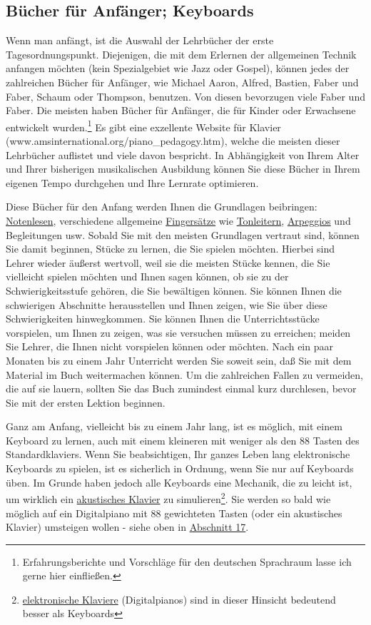 \subsection{Bücher für Anfänger; Keyboards}\hypertarget{c1iii18b}{}

Wenn man anfängt, ist die Auswahl der Lehrbücher der erste Tagesordnungspunkt.
Diejenigen, die mit dem Erlernen der allgemeinen Technik anfangen möchten (kein Spezialgebiet wie Jazz oder Gospel), können jedes der zahlreichen Bücher für Anfänger, wie Michael Aaron, Alfred, Bastien, Faber und Faber, Schaum oder Thompson, benutzen.
Von diesen bevorzugen viele Faber und Faber.
Die meisten haben Bücher für Anfänger, die für Kinder oder Erwachsene entwickelt wurden.\footnote{Erfahrungsberichte und Vorschläge für den deutschen Sprachraum lasse ich gerne hier einfließen.}
Es gibt eine exzellente Website für Klavier (www.amsinternational.org/piano_pedagogy.htm), welche die meisten dieser Lehrbücher auflistet und viele davon bespricht.
In Abhängigkeit von Ihrem Alter und Ihrer bisherigen musikalischen Ausbildung können Sie diese Bücher in Ihrem eigenen Tempo durchgehen und Ihre Lernrate optimieren.

Diese Bücher für den Anfang werden Ihnen die Grundlagen beibringen: \hyperlink{c1iii11}{Notenlesen}, verschiedene allgemeine \hyperlink{c1ii18}{Fingersätze} wie \hyperlink{c1iii5a}{Tonleitern}, \hyperlink{Arpeggios}{Arpeggios} und Begleitungen usw.
Sobald Sie mit den meisten Grundlagen vertraut sind, können Sie damit beginnen, Stücke zu lernen, die Sie spielen möchten.
Hierbei sind Lehrer wieder äußerst wertvoll, weil sie die meisten Stücke kennen, die Sie vielleicht spielen möchten und 
Ihnen sagen können, ob sie zu der Schwierigkeitsstufe gehören, die Sie bewältigen können.
Sie können Ihnen die schwierigen Abschnitte herausstellen und Ihnen zeigen, wie Sie über diese Schwierigkeiten hinwegkommen.
Sie können Ihnen die Unterrichtsstücke vorspielen, um Ihnen zu zeigen, was sie versuchen müssen zu erreichen; meiden Sie Lehrer, die Ihnen nicht vorspielen können oder möchten.
Nach ein paar Monaten bis zu einem Jahr Unterricht werden Sie soweit sein, daß Sie mit dem Material im Buch weitermachen können.
Um die zahlreichen Fallen zu vermeiden, die auf sie lauern, sollten Sie das Buch zumindest einmal kurz durchlesen, bevor Sie mit der ersten Lektion beginnen.

Ganz am Anfang, vielleicht bis zu einem Jahr lang, ist es möglich, mit einem Keyboard zu lernen, auch mit einem kleineren mit weniger als den 88 Tasten des Standardklaviers.
Wenn Sie beabsichtigen, Ihr ganzes Leben lang elektronische Keyboards zu spielen, ist es sicherlich in Ordnung, wenn Sie nur auf Keyboards üben.
Im Grunde haben jedoch alle Keyboards eine Mechanik, die zu leicht ist, um wirklich ein \hyperlink{c1iii17c}{akustisches Klavier} zu simulieren\footnote{\hyperlink{c1iii17b}{elektronische Klaviere} (Digitalpianos) sind in dieser Hinsicht bedeutend besser als Keyboards}.
Sie werden so bald wie möglich auf ein Digitalpiano mit 88 gewichteten Tasten (oder ein akustisches Klavier) umsteigen wollen - siehe oben in \hyperlink{c1iii17}{Abschnitt 17}.


